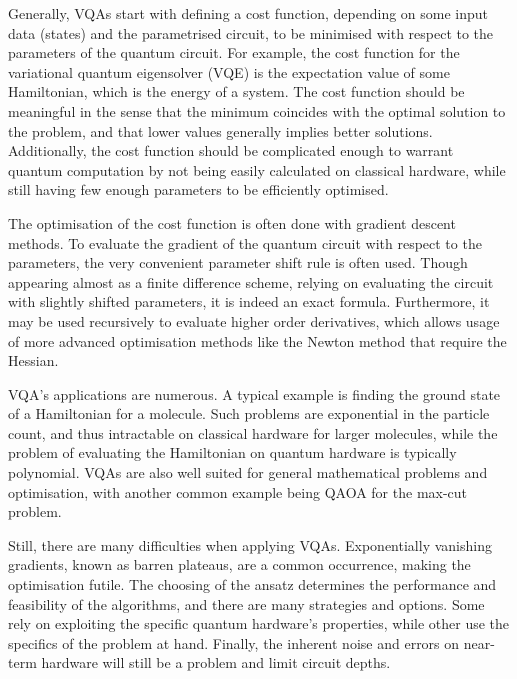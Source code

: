 Generally, VQAs start with defining a cost function, depending on some input data (states) and the parametrised circuit, to be minimised with respect to the parameters of the quantum circuit.
For example, the cost function for the variational quantum eigensolver (VQE) is the expectation value of some Hamiltonian, which is the energy of a system.
The cost function should be meaningful in the sense that the minimum coincides with the optimal solution to the problem, and that lower values generally implies better solutions.
Additionally, the cost function should be complicated enough to warrant quantum computation by not being easily calculated on classical hardware, while still having few enough parameters to be efficiently optimised.

The optimisation of the cost function is often done with gradient descent methods.
To evaluate the gradient of the quantum circuit with respect to the parameters, the very convenient parameter shift rule is often used.
Though appearing almost as a finite difference scheme, relying on evaluating the circuit with slightly shifted parameters, it is indeed an exact formula.
Furthermore, it may be used recursively to evaluate higher order derivatives, which allows usage of more advanced optimisation methods like the Newton method that require the Hessian.

VQA's applications are numerous.
A typical example is finding the ground state of a Hamiltonian for a molecule.
Such problems are exponential in the particle count, and thus intractable on classical hardware for larger molecules, while the problem of evaluating the Hamiltonian on quantum hardware is typically polynomial.
VQAs are also well suited for general mathematical problems and optimisation, with another common example being QAOA for the max-cut problem.

Still, there are many difficulties when applying VQAs.
Exponentially vanishing gradients, known as barren plateaus, are a common occurrence, making the optimisation futile.
The choosing of the ansatz determines the performance and feasibility of the algorithms, and there are many strategies and options.
Some rely on exploiting the specific quantum hardware's properties, while other use the specifics of the problem at hand.
Finally, the inherent noise and errors on near-term hardware will still be a problem and limit circuit depths.
